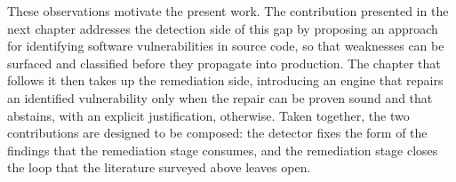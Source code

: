 These observations motivate the present work. The contribution
presented in the next chapter addresses the detection side of this gap
by proposing an approach for identifying software vulnerabilities in
source code, so that weaknesses can be surfaced and classified before
they propagate into production. The chapter that follows it then takes
up the remediation side, introducing an engine that repairs an
identified vulnerability only when the repair can be proven sound and
that abstains, with an explicit justification, otherwise. Taken
together, the two contributions are designed to be composed: the
detector fixes the form of the findings that the remediation stage
consumes, and the remediation stage closes the loop that the literature
surveyed above leaves open.